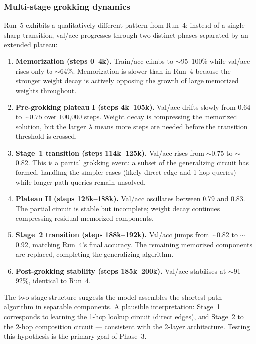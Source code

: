 \documentclass[11pt, a4paper]{article}
\begin{document}
\subsubsection{Multi-stage grokking dynamics}

Run~5 exhibits a qualitatively different pattern from Run~4: instead of a
single sharp transition, val/acc progresses through two distinct phases
separated by an extended plateau:

\begin{enumerate}[noitemsep]
  \item \textbf{Memorization (steps 0--4k).} Train/acc climbs to $\sim$95--100\%
        while val/acc rises only to $\sim$64\%. Memorization is slower than in
        Run~4 because the stronger weight decay is actively opposing the growth
        of large memorized weights throughout.

  \item \textbf{Pre-grokking plateau I (steps 4k--105k).} Val/acc drifts slowly
        from 0.64 to $\sim$0.75 over 100{,}000 steps. Weight decay is
        compressing the memorized solution, but the larger $\lambda$ means more
        steps are needed before the transition threshold is crossed.

  \item \textbf{Stage~1 transition (steps 114k--125k).} Val/acc rises from
        $\sim$0.75 to $\sim$0.82. This is a partial grokking event: a subset of
        the generalizing circuit has formed, handling the simpler cases (likely
        direct-edge and 1-hop queries) while longer-path queries remain unsolved.

  \item \textbf{Plateau II (steps 125k--188k).} Val/acc oscillates between
        0.79 and 0.83. The partial circuit is stable but incomplete; weight
        decay continues compressing residual memorized components.

  \item \textbf{Stage~2 transition (steps 188k--192k).} Val/acc jumps from
        $\sim$0.82 to $\sim$0.92, matching Run~4's final accuracy. The remaining
        memorized components are replaced, completing the generalizing algorithm.

  \item \textbf{Post-grokking stability (steps 185k--200k).} Val/acc stabilises
        at $\sim$91--92\%, identical to Run~4.
\end{enumerate}

The two-stage structure suggests the model assembles the shortest-path algorithm
in separable components. A plausible interpretation: Stage~1 corresponds to
learning the 1-hop lookup circuit (direct edges), and Stage~2 to the 2-hop
composition circuit --- consistent with the 2-layer architecture. Testing this
hypothesis is the primary goal of Phase~3.
\end{document}
